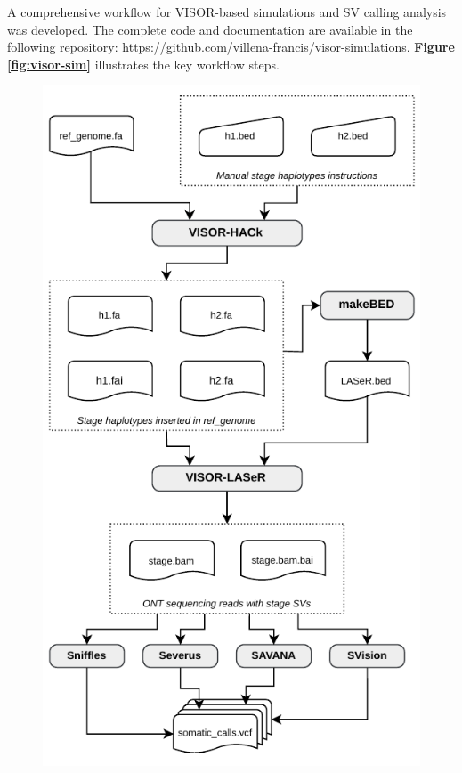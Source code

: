 A comprehensive workflow for VISOR-based simulations and SV calling analysis was 
developed. The complete code and documentation are available in the following
repository: \url{https://github.com/villena-francis/visor-simulations}. 
\textbf{Figure \ref{fig:visor-sim}} illustrates the key workflow steps.


\newpage

\begin{figure}[H]
    \centering
    \includegraphics[scale=1.3]{img/visor-simulations.pdf}

\end{figure}

